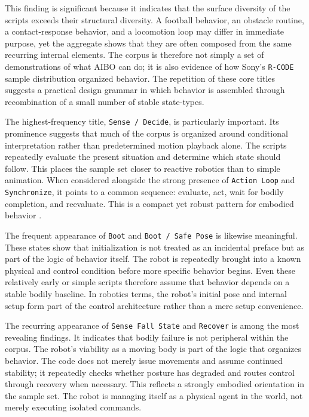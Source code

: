\documentclass[11pt]{article}
\begin{document}
This finding is significant because it indicates that the surface
diversity of the scripts exceeds their structural diversity. A football
behavior, an obstacle routine, a contact-response behavior, and a
locomotion loop may differ in immediate purpose, yet the aggregate
shows that they are often composed from the same recurring internal
elements. The corpus is therefore not simply a set of demonstrations of
what AIBO can do; it is also evidence of how Sony's \texttt{R-CODE}
sample distribution organized behavior. The repetition of these core
titles suggests a practical design grammar in which behavior is
assembled through recombination of a small number of stable
state-types.

The highest-frequency title, \texttt{Sense / Decide}, is particularly
important. Its prominence suggests that much of the corpus is organized
around conditional interpretation rather than predetermined motion
playback alone. The scripts repeatedly evaluate the present situation
and determine which state should follow. This places the sample set
closer to reactive robotics than to simple animation. When considered
alongside the strong presence of \texttt{Action Loop} and
\texttt{Synchronize}, it points to a common sequence: evaluate, act,
wait for bodily completion, and reevaluate. This is a compact yet
robust pattern for embodied behavior \cite{arkin1998behavior,brooks1991intelligence}.

The frequent appearance of \texttt{Boot} and \texttt{Boot / Safe Pose}
is likewise meaningful. These states show that initialization is not
treated as an incidental preface but as part of the logic of behavior
itself. The robot is repeatedly brought into a known physical and
control condition before more specific behavior begins. Even these
relatively early or simple scripts therefore assume that behavior
depends on a stable bodily baseline. In robotics terms, the robot's
initial pose and internal setup form part of the control architecture
rather than a mere setup convenience.

The recurring appearance of \texttt{Sense Fall State} and
\texttt{Recover} is among the most revealing findings. It indicates
that bodily failure is not peripheral within the corpus. The robot's
viability as a moving body is part of the logic that organizes
behavior. The code does not merely issue movements and assume continued
stability; it repeatedly checks whether posture has degraded and routes
control through recovery when necessary. This reflects a strongly
embodied orientation in the sample set. The robot is managing itself as
a physical agent in the world, not merely executing isolated commands.
\end{document}
